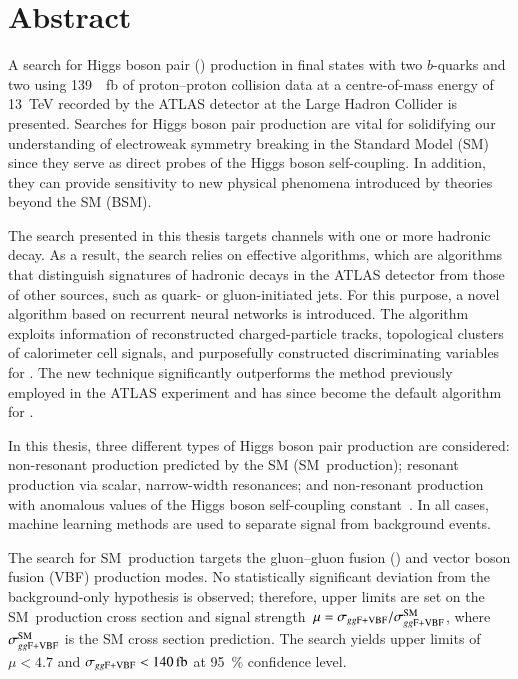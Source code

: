\chapter*{Abstract}

A search for Higgs boson pair (\HH) production in final states with two
$b$-quarks and two \tauleptons using \SI{139}{\per\femto\barn} of proton--proton
collision data at a centre-of-mass energy of \SI{13}{\TeV} recorded by the ATLAS
detector at the Large Hadron Collider
is presented. Searches for Higgs boson pair production are vital for solidifying
our understanding of electroweak symmetry breaking in the Standard Model (SM)
since they serve as direct probes of the Higgs boson self-coupling. In addition,
they can provide sensitivity to new physical phenomena introduced by theories
beyond the SM (BSM).

The search presented in this thesis targets channels with one or more hadronic
\taulepton decay. As a result, the search relies on effective \tauid algorithms,
which are algorithms that distinguish signatures of hadronic \taulepton decays
in the ATLAS detector from those of other sources, such as quark- or
gluon-initiated jets. For this purpose, a novel \tauid algorithm based on
recurrent neural networks is introduced. The algorithm exploits information of
reconstructed charged-particle tracks, topological clusters of calorimeter cell
signals, and purposefully constructed discriminating variables for \tauid. The
new technique significantly outperforms the method previously employed in the
ATLAS experiment and has since become the default algorithm for \tauid.

In this thesis, three different types of Higgs boson pair production are
considered: non-resonant \HH production predicted by the SM (SM~\HH production);
resonant \HH production via scalar, narrow-width resonances; and non-resonant
\HH production with anomalous values of the Higgs boson self-coupling
constant~\lambdahhh. In all cases, machine learning methods are used to separate
signal from background events.

The search for SM~\HH production targets the gluon--gluon fusion (\ggF) and
vector boson fusion (VBF) production modes. No statistically significant
deviation from the background-only hypothesis is observed; therefore, upper
limits are set on the SM~\HH production cross section \xsecggfvbf and signal
strength~$\mu = \sigma_{gg\text{F+VBF}} / \sigma_{gg\text{F+VBF}}^{\text{SM}}$, where
$\sigma_{gg\text{F+VBF}}^{\text{SM}}$ is the SM cross section prediction. The search yields
upper limits of $\mu < \num{4.7}$ and $\xsecggfvbf < \SI{140}{\femto\barn}$ at
\SI{95}{\percent} confidence level.

